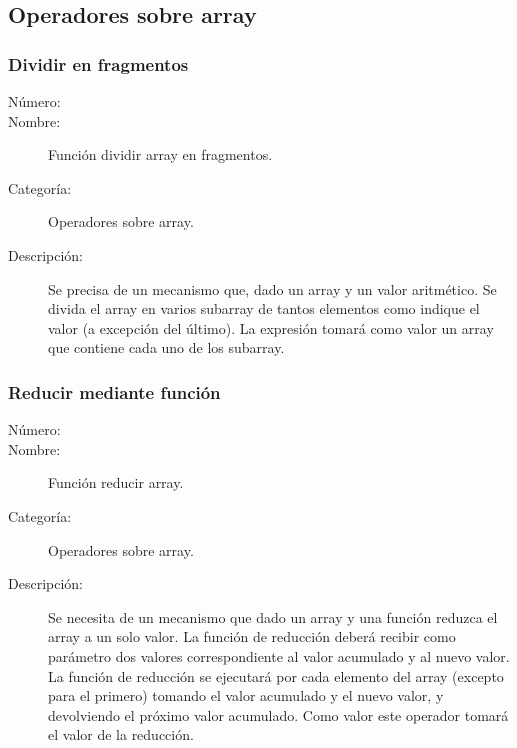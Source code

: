 \subsection{Operadores sobre array}

\subsubsection{Dividir en fragmentos}
	\begin{description}
		\item [Número:] \cn
		\item [Nombre:] Función dividir array en fragmentos.
		\item [Categoría:] Operadores sobre array.
		\item [Descripción:] Se precisa de un mecanismo que, dado un array y un valor aritmético. Se divida el array en varios subarray de tantos
      elementos como indique el valor (a excepción del último). 
      La expresión tomará como valor un array que contiene cada uno de los subarray.
	\end {description}

\subsubsection{Reducir mediante función}
	\begin{description}
		\item [Número:] \cn
		\item [Nombre:] Función reducir array.
		\item [Categoría:] Operadores sobre array.
		\item [Descripción:] Se necesita de un mecanismo que dado un array y una función reduzca el array a un solo valor.
      La función de reducción deberá recibir como parámetro dos valores correspondiente al valor acumulado y al nuevo valor. 
      La función de reducción se ejecutará por cada elemento del array (excepto para el primero) tomando el valor acumulado y el nuevo valor, y devolviendo
      el próximo valor acumulado. Como valor este operador tomará el valor de la reducción. 
	\end {description}


